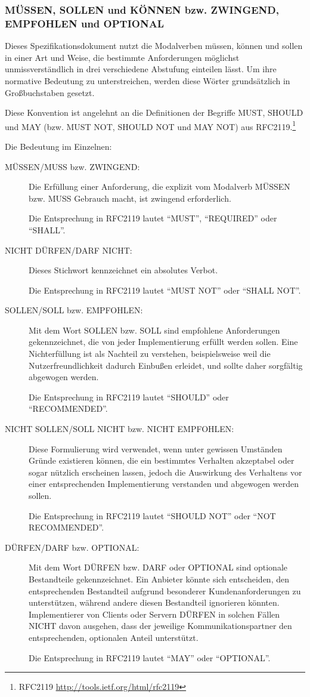 \documentclass[,a4paper]{article}
\begin{document}
\subsubsection{MÜSSEN, SOLLEN und KÖNNEN bzw. ZWINGEND, EMPFOHLEN und
OPTIONAL}

Dieses Spezifikationsdokument nutzt die Modalverben müssen, können und
sollen in einer Art und Weise, die bestimmte Anforderungen möglichst
unmissverständlich in drei verschiedene Abstufung einteilen lässt. Um
ihre normative Bedeutung zu unterstreichen, werden diese Wörter
grundsätzlich in Großbuchstaben gesetzt.

Diese Konvention ist angelehnt an die Definitionen der Begriffe MUST,
SHOULD und MAY (bzw. MUST NOT, SHOULD NOT und MAY NOT) aus
RFC2119.\footnote{RFC2119 \url{http://tools.ietf.org/html/rfc2119}}

Die Bedeutung im Einzelnen:

\begin{description}
\item[MÜSSEN/MUSS bzw. ZWINGEND:]
Die Erfüllung einer Anforderung, die explizit vom Modalverb MÜSSEN bzw.
MUSS Gebrauch macht, ist zwingend erforderlich.

Die Entsprechung in RFC2119 lautet ``MUST'', ``REQUIRED'' oder
``SHALL''.
\item[NICHT DÜRFEN/DARF NICHT:]
Dieses Stichwort kennzeichnet ein absolutes Verbot.

Die Entsprechung in RFC2119 lautet ``MUST NOT'' oder ``SHALL NOT''.
\item[SOLLEN/SOLL bzw. EMPFOHLEN:]
Mit dem Wort SOLLEN bzw. SOLL sind empfohlene Anforderungen
gekennzeichnet, die von jeder Implementierung erfüllt werden sollen.
Eine Nichterfüllung ist als Nachteil zu verstehen, beispielsweise weil
die Nutzerfreundlichkeit dadurch Einbußen erleidet, und sollte daher
sorgfältig abgewogen werden.

Die Entsprechung in RFC2119 lautet ``SHOULD'' oder ``RECOMMENDED''.
\item[NICHT SOLLEN/SOLL NICHT bzw. NICHT EMPFOHLEN:]
Diese Formulierung wird verwendet, wenn unter gewissen Umständen Gründe
existieren können, die ein bestimmtes Verhalten akzeptabel oder sogar
nützlich erscheinen lassen, jedoch die Auswirkung des Verhaltens vor
einer entsprechenden Implementierung verstanden und abgewogen werden
sollen.

Die Entsprechung in RFC2119 lautet ``SHOULD NOT'' oder ``NOT
RECOMMENDED''.
\item[DÜRFEN/DARF bzw. OPTIONAL:]
Mit dem Wort DÜRFEN bzw. DARF oder OPTIONAL sind optionale Bestandteile
gekennzeichnet. Ein Anbieter könnte sich entscheiden, den entsprechenden
Bestandteil aufgrund besonderer Kundenanforderungen zu unterstützen,
während andere diesen Bestandteil ignorieren könnten. Implementierer von
Clients oder Servern DÜRFEN in solchen Fällen NICHT davon ausgehen, dass
der jeweilige Kommunikationspartner den entsprechenden, optionalen
Anteil unterstützt.

Die Entsprechung in RFC2119 lautet ``MAY'' oder ``OPTIONAL''.
\end{description}
\end{document}
